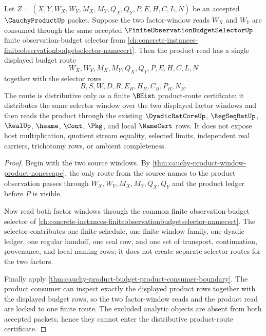 \begin{theorem}
\label{thm:cauchy-product-budget-selector-distributive-lock}
Let $Z=(X,Y,W_X,W_Y,M_X,M_Y,Q_X,Q_Y,P,E,H,C,L,N)$ be an accepted $\CauchyProductUp$ packet. Suppose the two factor-window reads $W_X$ and $W_Y$ are consumed through the same accepted $\FiniteObservationBudgetSelectorUp$ finite observation-budget selector from \autoref{ch:concrete-instances-finiteobservationbudgetselector-namecert}. Then the product read has a single displayed budget route
$$
W_X,W_Y,M_X,M_Y,Q_X,Q_Y,P,E,H,C,L,N
$$
together with the selector rows
$$
B,S,W,D,R,E_B,H_B,C_B,P_B,N_B.
$$
The route is distributive only as a finite $\BHist$ product-route certificate: it distributes the same selector window over the two displayed factor windows and then reads the product through the existing $\DyadicRatCoreUp$, $\RegSeqRatUp$, $\RealUp$, $\hsame$, $\Cont$, $\Pkg$, and local $\NameCert$ rows. It does not expose host multiplication, quotient stream equality, selected limits, independent real carriers, trichotomy rows, or ambient completeness.
\end{theorem}
\begin{proof}
Begin with the two source windows. By \autoref{thm:cauchy-product-window-product-nonescape}, the only route from the source names to the product observation passes through $W_X,W_Y,M_X,M_Y,Q_X,Q_Y$ and the product ledger before $P$ is visible.

Now read both factor windows through the common finite observation-budget selector of \autoref{ch:concrete-instances-finiteobservationbudgetselector-namecert}. The selector contributes one finite schedule, one finite window family, one dyadic ledger, one regular handoff, one seal row, and one set of transport, continuation, provenance, and local naming rows; it does not create separate selector routes for the two factors.

Finally apply \autoref{thm:cauchy-product-budget-product-consumer-boundary}. The product consumer can inspect exactly the displayed product rows together with the displayed budget rows, so the two factor-window reads and the product read are locked to one finite route. The excluded analytic objects are absent from both accepted packets, hence they cannot enter the distributive product-route certificate.
\end{proof}

